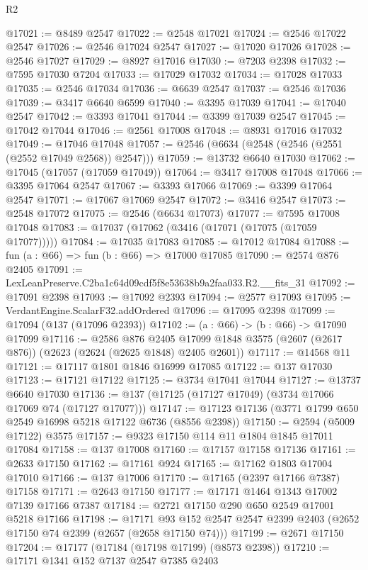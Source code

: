 \begin{lexlean}{R2}
\begin{coremodule}
@17021 := @8489 @2547
@17022 := @2548 @17021
@17024 := @2546 @17022 @2547
@17026 := @2546 @17024 @2547
@17027 := @17020 @17026
@17028 := @2546 @17027
@17029 := @8927 @17016
@17030 := @7203 @2398
@17032 := @7595 @17030 @7204
@17033 := @17029 @17032
@17034 := @17028 @17033
@17035 := @2546 @17034
@17036 := @6639 @2547
@17037 := @2546 @17036
@17039 := @3417 @6640 @6599
@17040 := @3395 @17039
@17041 := @17040 @2547
@17042 := @3393 @17041
@17044 := @3399 @17039 @2547
@17045 := @17042 @17044
@17046 := @2561 @17008
@17048 := @8931 @17016 @17032
@17049 := @17046 @17048
@17057 := @2546 (@6634 (@2548 (@2546 (@2551 (@2552 @17049 @2568)) @2547)))
@17059 := @13732 @6640 @17030
@17062 := @17045 (@17057 (@17059 @17049))
@17064 := @3417 @17008 @17048
@17066 := @3395 @17064 @2547
@17067 := @3393 @17066
@17069 := @3399 @17064 @2547
@17071 := @17067 @17069 @2547
@17072 := @3416 @2547
@17073 := @2548 @17072
@17075 := @2546 (@6634 @17073)
@17077 := @7595 @17008 @17048
@17083 := @17037 (@17062 (@3416 (@17071 (@17075 (@17059 @17077)))))
@17084 := @17035 @17083
@17085 := @17012 @17084
@17088 := fun (a : @66) => fun (b : @66) => @17000 @17085
@17090 := @2574 @876 @2405
@17091 := LexLeanPreserve.C2ba1c64d09cdf5f8e53638b9a2faa033.R2.__fits_31
@17092 := @17091 @2398
@17093 := @17092 @2393
@17094 := @2577 @17093
@17095 := VerdantEngine.ScalarF32.addOrdered
@17096 := @17095 @2398
@17099 := @17094 (@137 (@17096 @2393))
@17102 := (a : @66) -> (b : @66) -> @17090 @17099
@17116 := @2586
    @876
    @2405
    @17099
    @1848
    @3575
    (@2607 (@2617 @876))
    (@2623 (@2624 (@2625 @1848) @2405 @2601))
@17117 := @14568 @11
@17121 := @17117 @1801 @1846 @16999 @17085
@17122 := @137 @17030
@17123 := @17121 @17122
@17125 := @3734 @17041 @17044
@17127 := @13737 @6640 @17030
@17136 := @137 (@17125 (@17127 @17049) (@3734 @17066 @17069 @74 (@17127 @17077)))
@17147 := @17123 @17136 (@3771 @1799 @650 @2549 @16998 @5218 @17122 @6736 (@8556 @2398))
@17150 := @2594 (@5009 @17122) @3575
@17157 := @9323 @17150 @114 @11 @1804 @1845 @17011 @17084
@17158 := @137 @17008
@17160 := @17157 @17158 @17136
@17161 := @2633 @17150
@17162 := @17161 @924
@17165 := @17162 @1803 @17004 @17010
@17166 := @137 @17006
@17170 := @17165 (@2397 @17166 @7387) @17158
@17171 := @2643 @17150
@17177 := @17171 @1464 @1343 @17002 @7139 @17166 @7387
@17184 := @2721 @17150 @290 @650 @2549 @17001 @5218 @17166
@17198 := @17171
    @93
    @152
    @2547
    @2547
    @2399
    @2403
    (@2652 @17150 @74 @2399 (@2657 (@2658 @17150 @74)))
@17199 := @2671 @17150
@17204 := @17177 (@17184 (@17198 @17199) (@8573 @2398))
@17210 := @17171 @1341 @152 @7137 @2547 @7385 @2403

\end{coremodule}
\end{lexlean}
